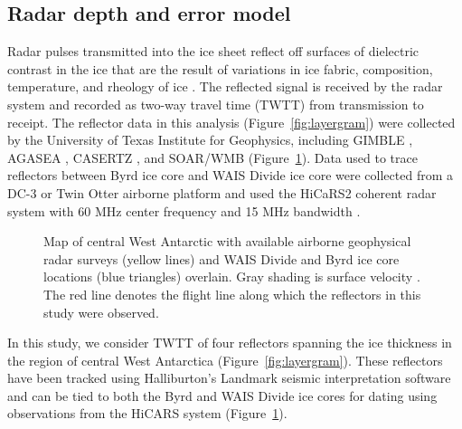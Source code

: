 


\subsection{Radar depth and error model}
 Radar pulses transmitted into the ice sheet reflect off surfaces of dielectric contrast in the ice that are the result of variations in ice fabric, composition, temperature, and rheology of ice \citep{fujita2000}. The reflected signal is received by the radar system and recorded as two-way travel time (TWTT) from transmission to receipt.  The reflector data in this analysis (Figure~\ref{fig:layergram}) were collected by the University of Texas Institute for Geophysics, including GIMBLE \citep{gimble2017}, AGASEA \citep{holt2006}, CASERTZ \citep{morse2002}, and SOAR/WMB \citep{luyendyk2003} (Figure~\ref{fig:radarmap}). Data used to trace reflectors between Byrd ice core and WAIS Divide ice core were collected from a DC-3 or Twin Otter airborne platform and used the HiCaRS2 coherent radar system with 60 MHz center frequency and 15 MHz bandwidth \citep{young2016}.%

\begin{figure}[h]
\centering
{}
\caption{Map of central West Antarctic with available airborne geophysical radar surveys (yellow lines) and  WAIS Divide and Byrd ice core locations (blue triangles) overlain. Gray shading is surface velocity \citep{rignot2011}. The red line denotes the flight line along which the reflectors in this study were observed. }
\label{fig:radarmap}
\end{figure}



In this study, we consider TWTT of four reflectors spanning the ice thickness in the region of central West Antarctica (Figure~\ref{fig:layergram}). These reflectors have been tracked using Halliburton's Landmark seismic interpretation software and can be tied to both the Byrd and WAIS Divide ice cores for dating using observations from the HiCARS system (Figure~\ref{fig:radarmap}). %

